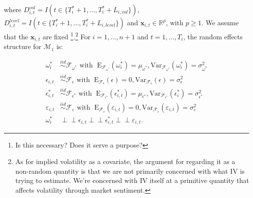 \documentclass[11pt]{article}
\newcommand{\x}{\textbf{x}}
\def\mbf#1{\mathbf{#1}} %
\newcommand{\simiid}{\stackrel{iid}{\sim}} %
\newcommand{\indep}{\perp \!\!\! \perp } %
\def\mrm#1{\mathrm{#1}} %
\def\mc#1{\mathcal{#1}} %
\def\mc#1{\mathcal{#1}}
\theoremstyle{definition}
\begin{document}
 where $D^{vol}_{i,t} = I(t \in \{T_i^* + 1,...,T_i^* + L_{i, vol}\})$, $D^{level}_{i,t} = I(t \in \{T_i^* + 1,...,T_i^* + L_{i, level}\})$ 
and $\x_{i,t} \in \mathbb{R}^{p}$, with $p \geq 1$.  We assume that the 
$\mbf{x}_{i,t}$ are fixed \footnote{Is this necessary?  Does it serve a purpose?}.\footnote{As for implied volatility as a covariate, the argument for regarding it as a non-random quantity is that we are not primarily concerned with what IV is trying to estimate.  We're concerned with IV itself at a primitive quantity that affects volatility through market sentiment.}  For $i = 1, \ldots, n+1$ and $t=1, \ldots, T_i$, the random effects structure for $\mc{M}_1$ is:

\begin{align*}
  \omega^{*}_i &\simiid \mc{F}_{\omega^{*}} \text{ with }  \; \mrm{E}_{\mc{F}_{\omega^{*}}}(\omega^{*}_i) = \mu_{\omega^{*}}, \mrm{Var}_{\mc{F}_{\omega^{*}}}(\omega^{*}_i)  = \sigma^2_{\omega^{*}}  \\
  \epsilon_{i,t} &\simiid \mc{F}_{\epsilon} \text{ with }  \; \mrm{E}_{\mc{F}_{\epsilon}}(\epsilon) = 0, \mrm{Var}_{\mc{F}_{\epsilon}}(\epsilon)  = \sigma^2_{\epsilon}  \\
  \epsilon^{*}_{i,t} &\simiid \mc{F}_{\epsilon^{*}} \text{ with }  \; \mrm{E}_{\mc{F}_{\epsilon^{*}}}(\epsilon^{*}_{i,t}) = \mu_{\epsilon^{*}}, \mrm{Var}_{\mc{F}_{\epsilon^{*}}}(\epsilon^{*}_i)  = \sigma^2_{\epsilon^{*}}  \\
  \varepsilon_{i,t} & \simiid  \mc{F}_{\varepsilon} \text{ with }  \; \mrm{E}_{\mc{F}_{\varepsilon}}(\varepsilon_{i,t}) = 0, \mrm{Var}_{\mc{F}_{\varepsilon}}(\varepsilon_{i,t}) = \sigma^2_{\varepsilon} \\
  \omega^{*}_{i} &\indep \epsilon_{i,t} \indep \epsilon^{*}_{i,t}  \indep \varepsilon_{i,t}.
  \end{align*}
\end{document}
